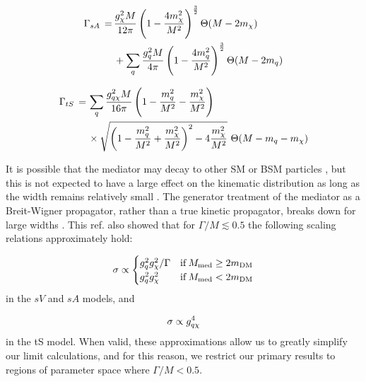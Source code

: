 \begin{equation}
  \begin{split}
    \Gamma_{sA} \, = \, & \frac{g_{\chi}^2 M}{12\pi}\left(1 - \frac{4 m_{\chi}^{2}}{M^{2}}\right)^{\frac{3}{2}} \Theta(M-2 m_{\chi}) \\
                  & + \sum_{\substack{q}}\frac{g_q^2 M}{4\pi}\left(1 - \frac{4m_{q}^{2}}{M^{2}}\right)^{\frac{3}{2}} \Theta(M-2m_q) \\
  \end{split}
\end{equation}

\begin{equation}
  \begin{split}
    \Gamma_{tS} \, = \, & \sum_{\substack{q}} \frac{g_{q \chi}^2M}{16\pi}\left(1 - \frac{m_{q}^{2}}{M^{2}} - \frac{m_{\chi}^{2}}{M^{2}}\right) \\
                  & \times \sqrt{\left(1 - \frac{m_{q}^{2}}{M^{2}} + \frac{m_{\chi}^{2}}{M^{2}}\right)^{2} - 4\frac{m_{\chi}^{2}}{M^{2}}} \,\, \Theta(M-m_q- m_{\chi}) \\
  \end{split}
\end{equation}

It is possible that the mediator may decay to other SM or BSM particles \cite{1411.0535}, but this is not expected to have a large effect on the kinematic distribution as long as the width remains relatively small \cite{1507.00966}.
The generator treatment of the mediator as a Breit-Wigner propagator, rather than a true kinetic propagator, breaks down for large widths \cite{NordstromSVD}. This ref. also showed that for $\Gamma/M \lesssim 0.5$ the following scaling relations approximately hold:

\begin{equation}
  \sigma \propto
  \begin{cases}
      g_q^2 g_{\chi}^2 / \Gamma & \mathrm{ if } \, M_{\mathrm{med}} \geq 2 m_{\mathrm{DM}}\\
      g_q^2 g_{\chi}^2 & \mathrm{ if } \, M_{\mathrm{med}} < 2 m_{\mathrm{DM}}
  \end{cases}
  \label{eq:sigma_propto_couplings_schan}
\end{equation}
in the $sV$ and $sA$ models, and

\begin{equation}
  \sigma \propto g_{q \chi}^4
  \label{eq:sigma_propto_couplings_tchan}
\end{equation}
in the tS model. When valid, these approximations allow us to greatly simplify our limit calculations, and for this reason, we restrict our primary results to regions of parameter space where $\Gamma/M < 0.5$.

